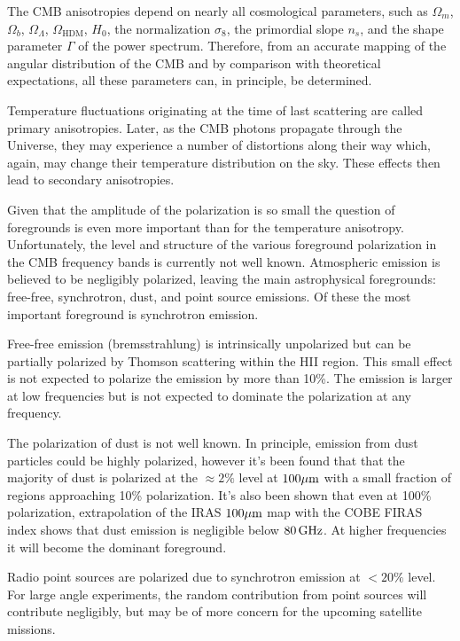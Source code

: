 \documentclass[a4paper,11pt]{article}
\begin{document}
{\noindent}The CMB anisotropies depend on nearly all cosmological parameters, such as $\Omega_m$, $\Omega_b$, $\Omega_\Lambda$, $\Omega_\mathrm{HDM}$, $H_0$, the normalization $\sigma_8$, the primordial slope $n_s$, and the shape parameter $\Gamma$ of the power spectrum. Therefore, from an accurate mapping of the angular distribution of the CMB and by comparison with theoretical expectations, all these parameters can, in principle, be determined.

{\noindent}Temperature fluctuations originating at the time of last scattering are called primary anisotropies. Later, as the CMB photons propagate through the Universe, they may experience a number of distortions along their way which, again, may change their temperature distribution on the sky. These effects then lead to secondary anisotropies.

{\noindent}Given that the amplitude of the polarization is so small the question of foregrounds is even more important than for the temperature anisotropy. Unfortunately, the level and structure of the various foreground polarization in the CMB frequency bands is currently not well known. Atmospheric emission is believed to be negligibly polarized, leaving the main astrophysical foregrounds: free-free, synchrotron, dust, and point source emissions. Of these the most important foreground is synchrotron emission.

{\noindent}Free-free emission (bremsstrahlung) is intrinsically unpolarized but can be partially polarized by Thomson scattering within the HII region. This small effect is not expected to polarize the emission by more than 10\%. The emission is larger at low frequencies but is not expected to dominate the polarization at any frequency.

{\noindent}The polarization of dust is not well known. In principle, emission from dust particles could be highly polarized, however it's been found that that the majority of dust is polarized at the $\approx2\%$ level at $100\mu{\rm m}$ with a small fraction of regions approaching 10\% polarization. It's also been shown that even at 100\% polarization, extrapolation of the IRAS $100\mu{\rm m}$ map with the COBE FIRAS index shows that dust emission is negligible below $80\,{\rm GHz}$. At higher frequencies it will become the dominant foreground.

{\noindent}Radio point sources are polarized due to synchrotron emission at $<20\%$ level. For large angle experiments, the random contribution from point sources will contribute negligibly, but may be of more concern for the upcoming satellite missions.
\end{document}
